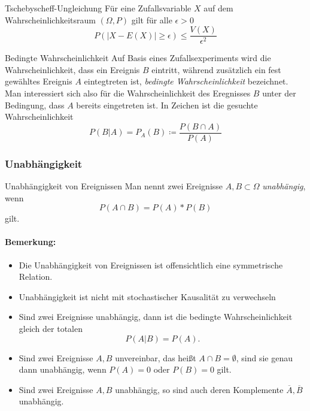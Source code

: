 \begin{satz}{Tschebyscheff-Ungleichung}
	Für eine Zufallsvariable $X$ auf dem Wahrscheinlichkeitsraum $(\Omega,P)$ gilt für alle $\epsilon>0$
	\begin{equation*}
		P(|X-E(X)|\geq \epsilon)\leq \frac{V(X)}{\epsilon^2}
	\end{equation*}
\end{satz}

\begin{definition}{Bedingte Wahrscheinlichkeit}
	Auf Basis eines Zufallsexperiments wird die Wahrscheinlichkeit, dass ein Ereignis $B$ eintritt, während zusätzlich ein fest gewähltes Ereignis $A$ eintegtreten ist, \emph{bedingte Wahrscheinlichkeit} bezeichnet. Man interessiert sich also für die Wahrscheinlichkeit des Eregnisses $B$ unter der Bedingung, dass $A$ bereits eingetreten ist. In Zeichen ist die gesuchte Wahrscheinlichkeit
	\begin{equation*}
		P(B|A)=P_A(B)\coloneqq\frac{P(B\cap A)}{P(A)}
	\end{equation*}
\end{definition}

\subsubsection{Unabhängigkeit}
\begin{definition}{Unabhängigkeit von Ereignissen}
	Man nennt zwei Ereignisse $A,B\subset \Omega$ \emph{unabhängig}, wenn
	\begin{equation*}
		P(A\cap B)=P(A)*P(B)
	\end{equation*}
	gilt.
\end{definition}
\paragraph{Bemerkung:}
\begin{itemize}
	\item Die Unabhängigkeit von Ereignissen ist offensichtlich eine symmetrische Relation.
	\item Unabhängigkeit ist nicht mit stochastischer Kausalität zu verwechseln
	\item Sind zwei Ereignisse unabhängig, dann ist die bedingte Wahrscheinlichkeit gleich der totalen
	\begin{equation*}
		P(A|B)=P(A).
	\end{equation*}
	\item Sind zwei Ereignisse $A,B$ unvereinbar, das heißt $A\cap B=\emptyset$, sind sie genau dann unabhängig, wenn $P(A)=0$ oder $P(B)=0$ gilt.
	\item Sind zwei Ereignisse $A,B$ unabhängig, so sind auch deren Komplemente $\overline A, \overline B$ unabhängig.
\end{itemize}



